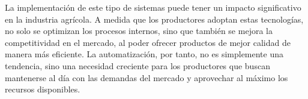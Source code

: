 La implementación de este tipo de sistemas puede tener un impacto significativo en la industria agrícola. A medida que los productores adoptan estas tecnologías, no solo se optimizan los procesos internos, sino que también se mejora la competitividad en el mercado, al poder ofrecer productos de mejor calidad de manera más eficiente. La automatización, por tanto, no es simplemente una tendencia, sino una necesidad creciente para los productores que buscan mantenerse al día con las demandas del mercado y aprovechar al máximo los recursos disponibles.